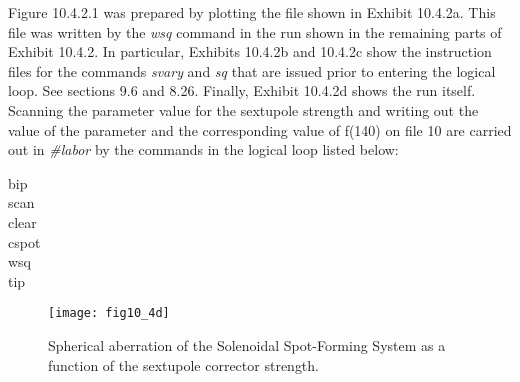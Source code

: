 Figure 10.4.2.1 was prepared by plotting the file shown in Exhibit 10.4.2a.
This file was written by the {\em wsq} command in the \Mary run shown in
the remaining parts of Exhibit 10.4.2.  In particular, Exhibits 10.4.2b
and 10.4.2c show the instruction files for the commands {\em svary} and
{\em sq} that are issued prior to entering the logical loop.  See
sections 9.6 and 8.26.  Finally, Exhibit 10.4.2d shows the \Mary run
itself.  Scanning the parameter value for the sextupole strength and
writing out the value of the parameter and the corresponding value of
f(140) on file 10 are carried out in {\em \#labor} by the commands in the
logical loop listed below:
\begin{center}
bip \\
scan \\
clear \\
cspot \\
wsq \\
tip
\end{center}

\begin{figure}[htbp]
\setcounter{figure}{0}
  \centering
  \texttt{[image: fig10\_4d]}
  \caption{Spherical aberration of the Solenoidal Spot-Forming System as a
function of the sextupole corrector strength.}
\end{figure}

